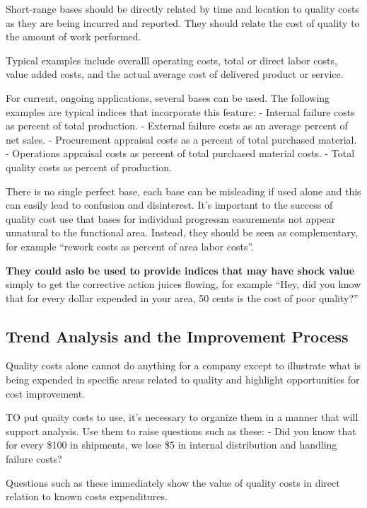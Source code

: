 \documentclass[11pt]{article}
\begin{document}
Short-range bases should be directly related by time and location to
quality costs as they are being incurred and reported. They should
relate the cost of quality to the amount of work performed.

Typical examples include overalll operating costs, total or direct labor
costs, value added costs, and the actual average cost of delivered
product or service.

For current, ongoing applications, several bases can be used. The
following examples are typical indices that incorporate this feature: -
Internal failure costs as percent of total production. - External
failure costs as an average percent of net sales. - Procurement
appraisal costs as a percent of total purchased material. - Operations
appraisal costs as percent of total purchased material costs. - Total
quality costs as percent of production.

There is no single perfect base, each base can be misleading if used
alone and this can easily lead to confusion and disinterest. It's
important to the success of quality cost use that bases for individual
progressm easurements not appear unnatural to the functional area.
Instead, they should be seen as complementary, for example ``rework
costs as percent of area labor costs''.

\textbf{They could aslo be used to provide indices that may have shock
value} simply to get the corrective action juices flowing, for example
``Hey, did you know that for every dollar expended in your area, 50
cents is the cost of poor quality?''

\hypertarget{trend-analysis-and-the-improvement-process}{%
\subsection{Trend Analysis and the Improvement
Process}\label{trend-analysis-and-the-improvement-process}}

Quality costs alone cannot do anything for a company except to
illustrate what is being expended in specific areas related to quality
and highlight opportunities for cost improvement.

TO put quaity costs to use, it's necessary to organize them in a manner
that will support analysis. Use them to raise questions such as these: -
Did you know that for every \$100 in shipments, we lose \$5 in internal
distribution and handling failure costs?

Questions such as these immediately show the value of quality costs in
direct relation to known costs expenditures.
\end{document}
